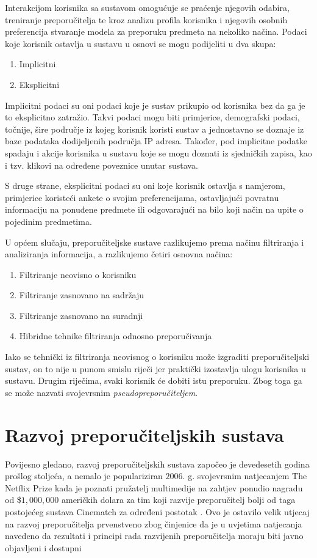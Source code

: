 \documentclass[times, utf8, diplomski, numeric]{fer}
\begin{document}
Interakcijom korisnika sa sustavom omogućuje se praćenje njegovih odabira,
treniranje preporučitelja te kroz analizu profila korisnika i njegovih osobnih
preferencija stvaranje modela za preporuku predmeta na nekoliko načina. Podaci
koje korisnik ostavlja u sustavu u osnovi se mogu podijeliti u dva skupa:
\begin{enumerate}
  \item Implicitni
  \item Eksplicitni
\end{enumerate}
Implicitni podaci su oni podaci koje je sustav prikupio od korisnika bez da ga
je to eksplicitno zatražio. Takvi podaci mogu biti primjerice, demografski
podaci, točnije, šire područje iz kojeg korisnik koristi sustav a jednostavno se
doznaje iz baze podataka dodijeljenih područja  IP adresa.
Također, pod implicitne podatke spadaju i akcije korisnika u sustavu koje se
mogu doznati iz sjedničkih zapisa, kao i tzv. klikovi na određene poveznice
unutar sustava.

S druge strane, eksplicitni podaci su oni koje korisnik ostavlja s namjerom,
primjerice koristeći ankete o svojim preferencijama, ostavljajući povratnu
informaciju na ponuđene predmete  ili odgovarajući na bilo
koji način na upite o pojedinim predmetima.

U općem slučaju, preporučiteljske sustave razlikujemo prema načinu filtriranja i
analiziranja informacija, a razlikujemo četiri osnovna načina:
\begin{enumerate}
  \item Filtriranje neovisno o korisniku 
  \item Filtriranje zasnovano na sadržaju 
  \item Filtriranje zasnovano na suradnji 
  \item Hibridne tehnike filtriranja odnosno preporučivanja
\end{enumerate}
Iako se tehnički iz filtriranja neovisnog o korisniku može izgraditi
preporučiteljski sustav, on to nije u punom smislu riječi jer praktički
izostavlja ulogu korisnika u sustavu. Drugim riječima, svaki korisnik će dobiti
istu preporuku. Zbog toga ga se može nazvati svojevrsnim
\emph{pseudopreporučiteljem}.

\section{Razvoj preporučiteljskih sustava}
Povijesno gledano, razvoj preporučiteljskih sustava započeo je devedesetih
godina prošlog stoljeća, a nemalo je populariziran $2006$. g. svojevrsnim
natjecanjem \glqq The Netflix Prize \grqq kada je poznati pružatelj multimedije
na zahtjev ponudio nagradu od \$$1,000,000$ američkih dolara za tim koji razvije
preporučitelj bolji od taga postojećeg sustava \glqq Cinematch \grqq za određeni
postotak \cite{Bennett2007}.
Ovo je ostavilo velik utjecaj na razvoj preporučitelja prvenstveno zbog
činjenice da je u uvjetima natjecanja navedeno da rezultati i principi rada
razvijenih preporučitelja moraju biti javno objavljeni i dostupni
\end{document}
